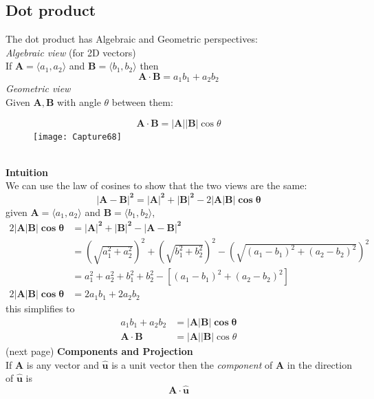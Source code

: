 \documentclass{report}
\begin{document}
\subsection{Dot product} %
The dot product has Algebraic and Geometric perspectives:\\
\textit{Algebraic view} (for 2D vectors)\\
If $\mathbf{A}=\langle a_1,a_2\rangle$ and $\mathbf{B}=\langle b_1,b_2\rangle$ then
\begin{equation*}
\mathbf{A\cdot B}=a_1b_1+a_2b_2
\end{equation*}
\textit{Geometric view}\\
Given $\mathbf{A,B}$ with angle $\theta$ between them:
\begin{figure}[h]
\begin{equation*}
\mathbf{A\cdot B}=\mathbf{|A||B|}\cos\theta
\end{equation*}
\texttt{[image: Capture68]}\\
\centering
\end{figure}\\
\textbf{Intuition}\\
We can use the law of cosines to show that the two views are the same:
\begin{equation*}
\mathbf{|A-B|^2=|A|^2+|B|^2}-2\mathbf{|A|B|\cos\theta}
\end{equation*}
given $\mathbf{A}=\langle a_1,a_2\rangle$ and $\mathbf{B}=\langle b_1,b_2\rangle$,
\begin{align*}
2\mathbf{|A|B|\cos\theta}&=\mathbf{|A|^2+|B|^2-|A-B|^2}\\
&=\left(\sqrt{a_1^2+a_2^2}\right)^2+\left(\sqrt{b_1^2+b_2^2}\right)^2-
\left(\sqrt{(a_1-b_1)^2+(a_2-b_2)^2}\right)^2\\
&=a_1^2+a_2^2+b_1^2+b_2^2-[(a_1-b_1)^2+(a_2-b_2)^2]\\
2\mathbf{|A|B|\cos\theta}&=2a_1b_1+2a_2b_2
\end{align*}
this simplifies to
\begin{align*}
a_1b_1+a_2b_2&=\mathbf{|A|B|\cos\theta}\\
\mathbf{A\cdot B}&=\mathbf{|A||B|}\cos\theta
\end{align*}
(next page)
\newpage
\noindent\textbf{Components and Projection}\\
If $\mathbf{A}$ is any vector and $\mathbf{\hat{u}}$ is a unit vector then the \textit{component}
of $\mathbf{A}$ in the direction of $\mathbf{\hat{u}}$ is 
\begin{equation*}
\mathbf{A\cdot\hat{u}}
\end{equation*}
\end{document}
